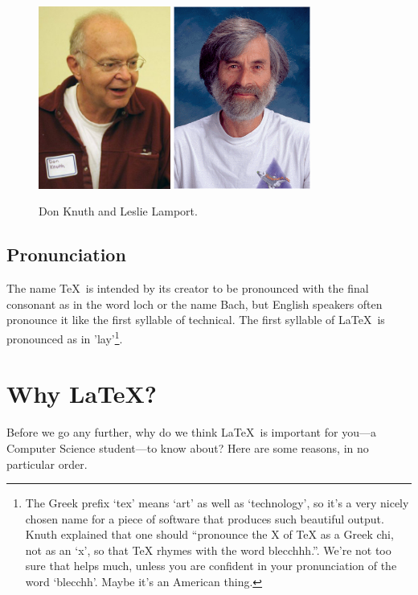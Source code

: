 \begin{figure}[hb]
  \centering
     \includegraphics[height=6cm]{images/knuth.png}
\quad\quad  \includegraphics[height=6cm]{images/lamport.png}
\caption{Don Knuth and Leslie Lamport.}\label{figure:knuthlamport}
\end{figure}

\subsection{Pronunciation}
\label{sec:pronunciation}
  The name \TeX\ is intended by its creator to be pronounced with the final consonant as in the word loch or the name Bach, but English speakers often pronounce it like the first syllable of technical. The first syllable of \LaTeX\ is pronounced as in 'lay'\footnote{The Greek prefix `tex' means `art' as well as `technology', so it's a very nicely chosen name for a piece of software that produces such beautiful output. Knuth explained \citep{knuth1984} that one should ``pronounce the X of TeX as a Greek chi, not as an `x', so that TeX rhymes with the word blecchhh.''. We're not too sure that helps much, unless you are confident in your pronunciation of the word `blecchh'. Maybe it's an American thing.}.


\section{Why \LaTeX?}
\label{sec:why}
 Before we go any further, why do we think \LaTeX\ is important for you---a Computer Science student---to know about? Here are some reasons, in no particular order.


